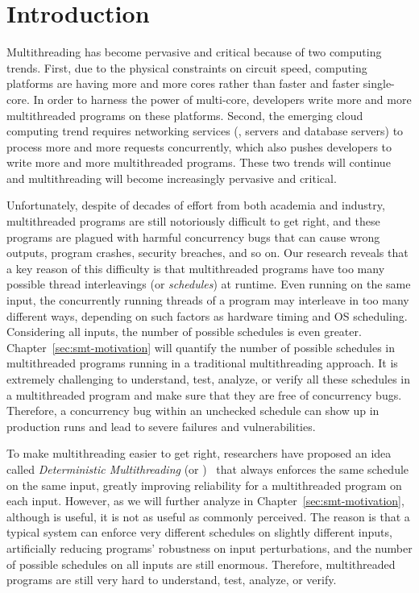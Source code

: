 \chapter{Introduction} \label{sec:intro}

Multithreading has become pervasive and critical because of two computing
trends. First, due to the physical constraints on circuit speed, computing
platforms are having more and more cores rather than faster and faster
single-core. In order to harness the power of multi-core, developers write more
and more multithreaded programs on these platforms. Second, the emerging cloud
computing trend requires networking services (\eg, \http servers and database
servers) to process more and more requests concurrently, which also pushes
developers to write more and more multithreaded programs. These two trends will
continue and multithreading will become increasingly pervasive and critical.

Unfortunately, despite of decades of effort from both academia and industry,
multithreaded programs are still notoriously difficult to get right, and these
programs are plagued with harmful concurrency bugs that can cause wrong outputs,
program crashes, security breaches, and so on. Our research reveals that a key
reason of this difficulty is that multithreaded programs have too many
possible thread interleavings (or \emph{schedules}) at runtime. Even running on 
the same input, the concurrently running threads of a program may interleave in 
too many different ways, depending on such factors as hardware timing and OS
scheduling. Considering all inputs, the number of possible schedules is even
greater. Chapter~\ref{sec:smt-motivation} will quantify the number of
possible schedules in multithreaded programs running in a traditional
multithreading approach. It is extremely challenging to understand, test, 
analyze, or verify all these schedules in a multithreaded program and 
make sure that they are free of concurrency bugs. Therefore, a concurrency bug 
within an unchecked schedule can show up in production runs and lead to severe 
failures and vulnerabilities.

To make multithreading easier to get right, researchers have proposed an idea 
called \emph{Deterministic Multithreading} (or 
\emph{\dmt})~\cite{dthreads:sosp11, dpj:oopsla09, dmp:asplos09, kendo:asplos09, 
coredet:asplos10} that always enforces the same schedule on the same input, 
greatly improving reliability for a multithreaded program on each input. 
However, as we will further analyze in
Chapter~\ref{sec:smt-motivation}, although \dmt is useful, it is not as useful
as commonly perceived. The reason is that a typical \dmt system can enforce
very different schedules on slightly different inputs, artificially reducing
programs' robustness on input perturbations, and the number of possible
schedules on all inputs are still enormous. Therefore, multithreaded programs
are still very hard to understand, test, analyze, or verify.

